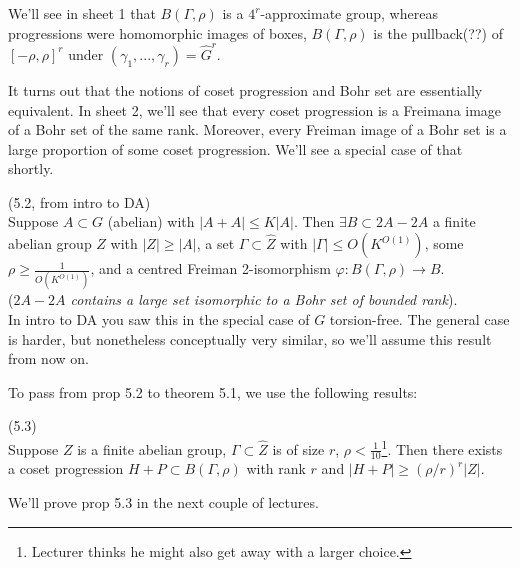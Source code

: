 \documentclass[a4paper]{article}
\begin{document}
We'll see in sheet 1 that $B(\Gamma,\rho)$ is a $4^r$-approximate group, whereas progressions were homomorphic images of boxes, $B(\Gamma,\rho)$ is the pullback(??) of $[-\rho,\rho]^r$ under $(\gamma_1,...,\gamma_r) = \hat{G}^r$.

It turns out that the notions of coset progression and Bohr set are essentially equivalent. In sheet 2, we'll see that every coset progression is a Freimana image of a Bohr set of the same rank. Moreover, every Freiman image of a Bohr set is a large proportion of some coset progression. We'll see a special case of that shortly.

\begin{prop} (5.2, from intro to DA)\\
Suppose $A \subset G$ (abelian) with $|A+A| \leq K|A|$. Then $\exists B \subset 2A-2A$ a finite abelian group $Z$ with $|Z| \geq |A|$, a set $\Gamma \subset \hat{Z}$ with $|\Gamma| \leq O(K^{O(1)})$, some $\rho \geq \frac{1}{O(K^{O(1)})}$, and a centred Freiman 2-isomorphism $\varphi:B(\Gamma,\rho) \to B$.\\
(\emph{$2A-2A$ contains a large set isomorphic to a Bohr set of bounded rank}).\\
In intro to DA you saw this in the special case of $G$ torsion-free. The general case is harder, but nonetheless conceptually very similar, so we'll assume this result from now on.
\end{prop}

To pass from prop 5.2 to theorem 5.1, we use the following results:

\begin{prop} (5.3)\\
Suppose $Z$ is a finite abelian group, $\Gamma \subset \hat{Z}$ is of size $r$, $\rho<\frac{1}{10}$\footnote{Lecturer thinks he might also get away with a larger choice.}. Then there exists a coset progression $H+P \subset B(\Gamma,\rho)$ with rank $r$ and $|H+P| \geq (\rho/r)^r |Z|$.
\end{prop}

We'll prove prop 5.3 in the next couple of lectures.
\end{document}
